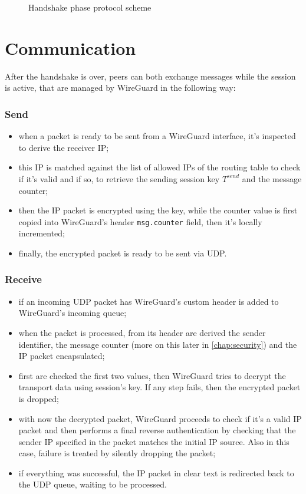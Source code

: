 \documentclass[light]{academica}
\begin{document}
\begin{figure}[H]
  \centering
  
  \caption{Handshake phase protocol scheme}
  \label{fig:handshakescheme}
\end{figure}

\section{Communication}\label{sec:communication}

After the handshake is over, peers can both exchange messages while the session is active, that are managed by WireGuard in the following way:

\subsubsection{Send}

\begin{itemize}
  \item when a packet is ready to be sent from a WireGuard interface, it's inspected to derive the receiver IP;
  \item this IP is matched against the list of allowed IPs of the routing table to check if it's valid and if so, to retrieve the sending session key $T^{send}$ and the message counter;
  \item then the IP packet is encrypted using the key, while the counter value is first copied into WireGuard's header \texttt{msg.counter} field, then it's locally incremented;
  \item finally, the encrypted packet is ready to be sent via UDP.
\end{itemize}

\subsubsection{Receive}

\begin{itemize}
  \item if an incoming UDP packet has WireGuard's custom header is added to WireGuard's incoming queue;
  \item when the packet is processed, from its header are derived the sender identifier, the message counter (more on this later in \autoref{chap:security}) and the IP packet encapsulated;
  \item first are checked the first two values, then WireGuard tries to decrypt the transport data using session's key. If any step fails, then the encrypted packet is dropped;
  \item with now the decrypted packet, WireGuard proceeds to check if it's a valid IP packet and then performs a final reverse authentication by checking that the sender IP specified in the packet matches the initial IP source. Also in this case, failure is treated by silently dropping the packet;
  \item if everything was successful, the IP packet in clear text is redirected back to the UDP queue, waiting to be processed.
\end{itemize}
\end{document}
